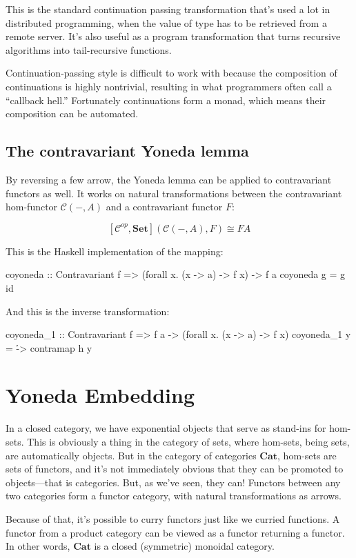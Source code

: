 \documentclass[DaoFP]{subfiles}
\begin{document}
This is the standard continuation passing transformation that's used a lot in distributed programming, when the value of type  has to be retrieved from a remote server. It's also useful as a program transformation that turns recursive algorithms into tail-recursive functions.

Continuation-passing style is difficult to work with because the composition of continuations is highly nontrivial, resulting in what programmers often call a ``callback hell.'' Fortunately continuations form a monad, which means their composition can be automated.

\subsection{The contravariant Yoneda lemma}

By reversing a few arrow, the Yoneda lemma can be applied to contravariant functors as well. It works on natural transformations between the contravariant hom-functor $\mathcal{C}(-, A)$ and a contravariant functor $F$:

\[ [\mathcal{C}^{op}, \mathbf{Set}]( \mathcal{C}(-, A), F) \cong F A \]

This is the Haskell implementation of the mapping:
\begin{haskell}
coyoneda :: Contravariant f => (forall x. (x -> a) -> f x) -> f a
coyoneda g = g id
\end{haskell}
And this is the inverse transformation:
\begin{haskell}
coyoneda_1 :: Contravariant f => f a -> (forall x. (x -> a) -> f x)
coyoneda_1 y = \h -> contramap h y
\end{haskell}

\section{Yoneda Embedding}

In a closed category, we have exponential objects that serve as stand-ins for hom-sets. This is obviously a thing in the category of sets, where hom-sets, being sets, are automatically objects. But in the category of categories  $\mathbf{Cat}$, hom-sets are sets of functors, and it's not immediately obvious that they can be promoted to objects---that is categories. But, as we've seen, they can! Functors between any two categories form a functor category, with natural transformations as arrows.

Because of that, it's possible to curry functors just like we curried functions. A functor from a product category can be viewed as a functor returning a functor. In other words, $\mathbf{Cat}$ is a closed (symmetric) monoidal category.
\end{document}
